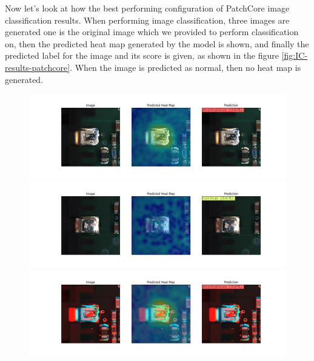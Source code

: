 Now let's look at how the best performing configuration of PatchCore image classification results. When performing image classification, three images are generated one is the original image which we provided to perform classification on, then the predicted heat map generated by the model is shown, and finally the predicted label for the image and its score is given, as shown in the figure \ref{fig:IC-results-patchcore}. When the image is predicted as normal, then no heat map is generated.

\begin{figure}[ht!]
    \centering  
    \begin{minipage}{1\textwidth}
        \centering
        \includegraphics[width=1\textwidth]{Rohit_Master_Thesis//Images/IC_NG.png} %
    \end{minipage}
    

    \begin{minipage}{1\textwidth}
        \centering
        \includegraphics[width=1\textwidth]{Rohit_Master_Thesis//Images/IC_FC.png} %
    \end{minipage}
    

    \begin{minipage}{1\textwidth}
        \centering
        \includegraphics[width=1\textwidth]{Rohit_Master_Thesis//Images/IC_NG2.png} %
    \end{minipage}
    

\end{figure}
